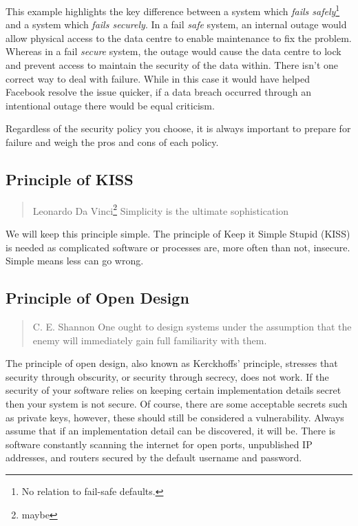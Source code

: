 This example highlights the key difference between a system which \textsl{fails safely}\footnote{No relation to fail-safe defaults.} and a system which \textsl{fails securely}.
In a fail \textsl{safe} system, an internal outage would allow physical access to the data centre to enable maintenance to fix the problem.
Whereas in a fail \textsl{secure} system, the outage would cause the data centre to lock and prevent access to maintain the security of the data within.
There isn't one correct way to deal with failure.
While in this case it would have helped Facebook resolve the issue quicker,
if a data breach occurred through an intentional outage there would be equal criticism.

Regardless of the security policy you choose, it is always important to prepare for failure and weigh the pros and cons of each policy.

\subsection{Principle of KISS}

\begin{quote}{Leonardo Da Vinci\footnote{maybe}}
Simplicity is the ultimate sophistication
\end{quote}

\noindent We will keep this principle simple.
The principle of Keep it Simple Stupid (KISS) is needed as complicated software or processes are, more often than not, insecure.
Simple means less can go wrong.

\subsection{Principle of Open Design}

\begin{quote}{C. E. Shannon \cite{shannons-maxim}}
One ought to design systems under the assumption that the enemy will immediately gain full familiarity with them.
\end{quote}

\noindent The principle of open design, also known as Kerckhoffs' principle,
stresses that security through obscurity, or security through secrecy, does not work.
If the security of your software relies on keeping certain implementation details secret then your system is not secure.
Of course, there are some acceptable secrets such as private keys, however, these should still be considered a vulnerability.
Always assume that if an implementation detail can be discovered, it will be.
There is software constantly scanning the internet for open ports, unpublished IP addresses,
and routers secured by the default username and password.

